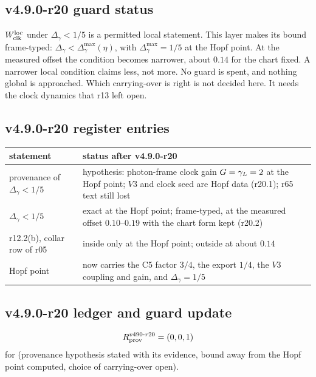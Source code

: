 \subsection*{v4.9.0-r20 guard status}
\label{subsec:v490-r20-guard}

\(W_{\rm clk}^{\rm loc}\) under \(\Delta_\gamma<1/5\) is a permitted local statement.  This layer makes its bound frame-typed:
\(\Delta_\gamma<\Delta_\gamma^{\max}(\eta)\), with \(\Delta_\gamma^{\max}=1/5\) at the Hopf point.  At the measured offset the
condition becomes narrower, about \(0.14\) for the chart fixed.  A narrower local condition claims less, not more.  No guard is
spent, and nothing global is approached.  Which carrying-over is right is not decided here.  It needs the clock dynamics that
r13 left open.

\subsection*{v4.9.0-r20 register entries}
\label{subsec:v490-r20-register}

\begin{center}
\small
\begin{tabular}{@{}>{\raggedright\arraybackslash}p{}>{\raggedright\arraybackslash}p{}@{}}
\toprule
statement & status after v4.9.0-r20\\
\midrule
provenance of \(\Delta_\gamma<1/5\) & hypothesis: photon-frame clock gain \(G=\gamma_L=2\) at the Hopf point; \(V3\) and clock seed are Hopf data (r20.1); r65 text still lost\\
\(\Delta_\gamma<1/5\) & exact at the Hopf point; frame-typed, at the measured offset \(0.10\)--\(0.19\) with the chart form kept (r20.2)\\
r12.2(b), collar row of r05 & inside only at the Hopf point; outside at about \(0.14\)\\
Hopf point & now carries the C5 factor \(3/4\), the export \(1/4\), the \(V3\) coupling and gain, and \(\Delta_\gamma=1/5\)\\
\bottomrule
\end{tabular}
\end{center}

\subsection*{v4.9.0-r20 ledger and guard update}
\label{subsec:v490-r20-ledger-guard}

\[
R_{\rm prov}^{v490\text{-}r20}=(0,0,1)
\]
for (provenance hypothesis stated with its evidence, bound away from the Hopf point computed, choice of carrying-over open).

